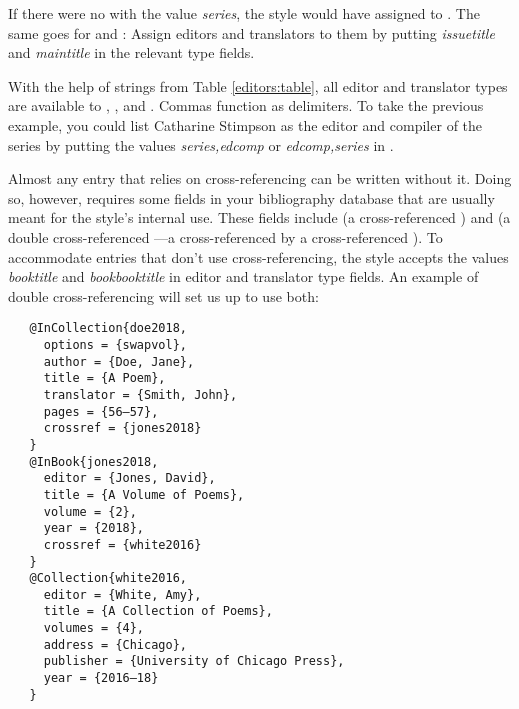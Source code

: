 \documentclass[11pt,letterpaper,oneside]{article}
\begin{document}
\begin{citebib}
\item \cite{allen2009}
\end{citebib}

\noindent If there were no  with the value
\textit{series}, the style would have assigned  to
. The same goes for  and
: Assign editors and translators to them by
putting \textit{issuetitle} and \textit{maintitle} in the relevant
type fields.

With the help of strings from Table \ref{editors:table}, all editor and
translator types are available to ,
, and . Commas function as
delimiters. To take the previous example, you could list Catharine
Stimpson as the editor and compiler of the series by putting the
values \textit{series,edcomp} or \textit{edcomp,series} in
.

Almost any entry that relies on cross-referencing can be written
without it. Doing so, however, requires some fields in your
bibliography database that are usually meant for the style's internal
use. These fields include  (a cross-referenced
) and  (a double
cross-referenced ---a 
cross-referenced by a cross-referenced ). To
accommodate entries that don't use cross-referencing, the style
accepts the values \textit{booktitle} and \textit{bookbooktitle} in
editor and translator type fields. An example of double
cross-referencing will set us up to use both:

\begin{verbatim}
   @InCollection{doe2018,
     options = {swapvol},
     author = {Doe, Jane},
     title = {A Poem},
     translator = {Smith, John},
     pages = {56–57},
     crossref = {jones2018}
   }
   @InBook{jones2018,
     editor = {Jones, David},
     title = {A Volume of Poems},
     volume = {2},
     year = {2018},
     crossref = {white2016}
   }
   @Collection{white2016,
     editor = {White, Amy},
     title = {A Collection of Poems},
     volumes = {4},
     address = {Chicago},
     publisher = {University of Chicago Press},
     year = {2016–18}
   }
\end{verbatim}

\begin{citebib}
\item \cite[56]{doe2018}
\end{citebib}
\end{document}
